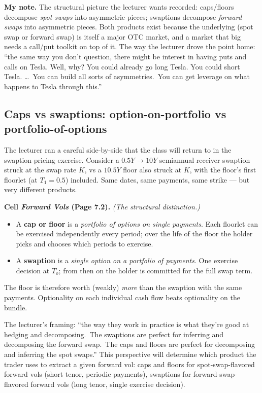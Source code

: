 \begin{checkpoint}
\textbf{My note.} The structural picture the lecturer wants recorded:
caps/floors decompose \emph{spot swaps} into asymmetric pieces;
swaptions decompose \emph{forward swaps} into asymmetric pieces.
Both products exist because the underlying (spot swap or forward
swap) is itself a major OTC market, and a market that big needs a
call/put toolkit on top of it. The way the lecturer drove the point
home: ``the same way you don't question, there might be interest in
having puts and calls on Tesla. Well, why? You could already go long
Tesla. You could short Tesla. \ldots\ You can build all sorts of
asymmetries.\ You can get leverage on what happens to Tesla through
this.''
\end{checkpoint}

\subsection{Caps vs swaptions: option-on-portfolio vs portfolio-of-options}\label{L6-sec:caps-vs-swaptions}

The lecturer ran a careful side-by-side that the class will return to
in the swaption-pricing exercise. Consider a $0.5Y \to 10Y$ semiannual
receiver swaption struck at the swap rate $K$, vs a $10.5Y$ floor
also struck at $K$, with the floor's first floorlet (at $T_1 = 0.5$)
included. Same dates, same payments, same strike --- but very
different products.

\begin{keyblock}
\textbf{Cell \emph{Forward Vols} (Page 7.2).} \emph{(The structural
distinction.)}
\begin{itemize}
  \item A \textbf{cap or floor} is a \emph{portfolio of options on
        single payments}. Each floorlet can be exercised independently
        every period; over the life of the floor the holder picks and
        chooses which periods to exercise.
  \item A \textbf{swaption} is a \emph{single option on a portfolio
        of payments}. One exercise decision at $T_o$; from then on
        the holder is committed for the full swap term.
\end{itemize}
The floor is therefore worth (weakly) \emph{more} than the swaption
with the same payments. Optionality on each individual cash flow
beats optionality on the bundle.
\end{keyblock}

The lecturer's framing: ``the way they work in practice is what
they're good at hedging and decomposing.\ The swaptions are perfect
for inferring and decomposing the forward swap.\ The caps and floors
are perfect for decomposing and inferring the spot swaps.''
This perspective will determine which product the trader uses to
extract a given forward vol: caps and floors for spot-swap-flavored
forward vols (short tenor, periodic payments), swaptions for
forward-swap-flavored forward vols (long tenor, single exercise
decision).

